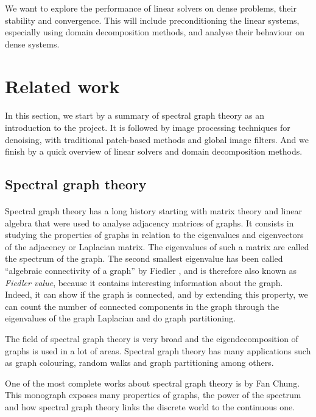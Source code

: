 We want to explore the performance of linear solvers on dense problems, their stability and convergence.
This will include preconditioning the linear systems, especially using domain decomposition methods, and analyse their behaviour on dense systems.

\section{Related work}

\paragraph{}
In this section, we start by a summary of spectral graph theory as an introduction to the project.
It is followed by image processing techniques for denoising, with traditional patch-based methods and global image filters.
And we finish by a quick overview of linear solvers and domain decomposition methods.

\subsection{Spectral graph theory}

\paragraph{}
Spectral graph theory has a long history starting with matrix theory and linear algebra that were used to analyse adjacency matrices of graphs.
It consists in studying the properties of graphs in relation to the eigenvalues and eigenvectors of the adjacency or Laplacian matrix.
The eigenvalues of such a matrix are called the spectrum of the graph.
The second smallest eigenvalue has been called ``algebraic connectivity of a graph'' by Fiedler \cite{fiedler_algebraic_1973}, and is therefore also known as \textit{Fiedler value}, because it contains interesting information about the graph.
Indeed, it can show if the graph is connected, and by extending this property, we can count the number of connected components in the graph through the eigenvalues of the graph Laplacian and do graph partitioning.

The field of spectral graph theory is very broad and the eigendecomposition of graphs is used in a lot of areas.
Spectral graph theory has many applications such as graph colouring, random walks and graph partitioning among others.

One of the most complete works about spectral graph theory is \cite{chung_spectral_1997} by Fan Chung.
This monograph exposes many properties of graphs, the power of the spectrum and how spectral graph theory links the discrete world to the continuous one.

